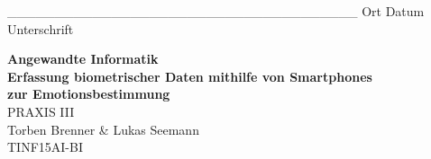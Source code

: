 \documentclass[12pt,titlepage,ngerman]{article}
\begin{document}
\newline \newline \newline \newline
{\_\_\_\_\_\_\_\_\_\_\_\_\_\_\_\_\_\_\_\_\_\_\_\_\_\_\_\_\_\_\_\_\_\_\_\_\_}\space\space\space\space\space\space\space\space\space\space\space\space\space\space\space\space\space\space\space\space\space\space\space\space\space {\_\_\_\_\_\_\_\_\_\_\_\_\_\_\_\_\_\_\_\_\_\_\_\_\_\_\_\_\_\_\_\_\_\_\_\_\_\_\_\_\_\_\_\_\_\_\_\_\_\_\_} \newline
Ort \space\space\space\space\space\space\space\space\space\space\space\space\space\space Datum \space\space\space\space\space\space\space\space\space\space\space\space\space\space\space\space\space\space\space\space\space\space\space\space\space\space\space\space\space\space\space\space\space\space\space\space\space\space\space\space\space\space\space\space\space\space\space\space\space\space\space\space Unterschrift
\newpage
\onehalfspacing
{}
\begin{flushright}
	\vspace{1cm}
	{\bfseries Angewandte Informatik} \\
	\vspace{\baselineskip}
	{\bfseries Erfassung biometrischer Daten mithilfe von Smartphones} \\
	{\bfseries zur Emotionsbestimmung} \\
	\vspace{0.5cm}
	PRAXIS III \\
	Torben Brenner \& Lukas Seemann \\
	TINF15AI-BI
\end{flushright}
\end{document}
